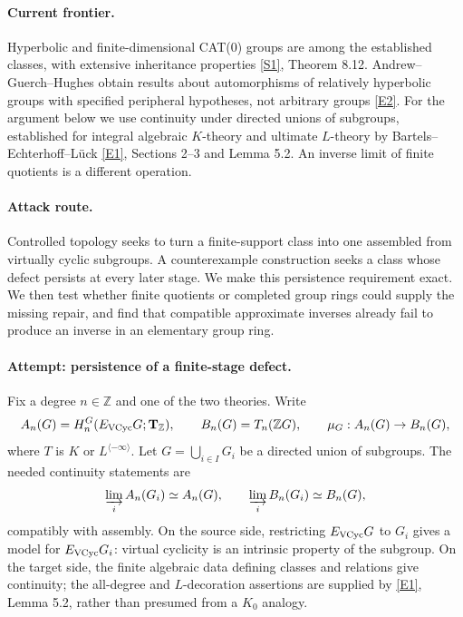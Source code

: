 \documentclass[11pt,a4paper]{article}
\newcommand{\Z}{\mathbb{Z}}
\newcommand{\sref}[2]{\hyperlink{source:#1:#2}{[S#2]}}
\newcommand{\eref}[2]{\hyperlink{extra:#1:#2}{[E#2]}}
\numberwithin{equation}{section}
\begin{document}
\paragraph{Current frontier.}
Hyperbolic and finite-dimensional CAT(0) groups are among the established classes, with extensive inheritance properties \sref{68}{1}, Theorem 8.12. Andrew--Guerch--Hughes obtain results about automorphisms of relatively hyperbolic groups with specified peripheral hypotheses, not arbitrary groups \eref{68}{2}. For the argument below we use continuity under directed unions of subgroups, established for integral algebraic $K$-theory and ultimate $L$-theory by Bartels--Echterhoff--Lück \eref{68}{1}, Sections 2--3 and Lemma 5.2. An inverse limit of finite quotients is a different operation.

\paragraph{Attack route.}
Controlled topology seeks to turn a finite-support class into one assembled from virtually cyclic subgroups. A counterexample construction seeks a class whose defect persists at every later stage. We make this persistence requirement exact. We then test whether finite quotients or completed group rings could supply the missing repair, and find that compatible approximate inverses already fail to produce an inverse in an elementary group ring.

\paragraph{Attempt: persistence of a finite-stage defect.}
Fix a degree $n\in\Z$ and one of the two theories. Write
\[
 A_n(G)=H_n^G(E_{\rm VCyc}G;\mathbf T_{\Z}),\qquad
 B_n(G)=T_n(\Z G),\qquad \mu_G:A_n(G)\to B_n(G),
\]
where $T$ is $K$ or $L^{\langle-\infty\rangle}$. Let $G=\bigcup_{i\in I}G_i$ be a directed union of subgroups. The needed continuity statements are
\begin{equation}\label{r68:colimit}
 \varinjlim_i A_n(G_i)\simeq A_n(G),\qquad
 \varinjlim_i B_n(G_i)\simeq B_n(G),
\end{equation}
compatibly with assembly. On the source side, restricting $E_{\rm VCyc}G$ to $G_i$ gives a model for $E_{\rm VCyc}G_i$: virtual cyclicity is an intrinsic property of the subgroup. On the target side, the finite algebraic data defining classes and relations give continuity; the all-degree and $L$-decoration assertions are supplied by \eref{68}{1}, Lemma 5.2, rather than presumed from a $K_0$ analogy.
\end{document}
